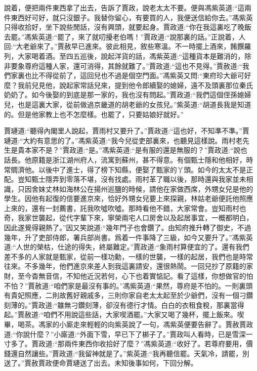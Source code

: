 \begin{parag}
    說着，便把兩件東西拿了出去，告訴了賈政，說老太太不要。便與馮紫英道:“這兩件東西好可好，就只沒銀子。我替你留心，有要買的人，我便送信給你去。”馮紫英只得收拾好，坐下說些閒話，沒有興頭，就要起身。賈政道:“你在我這裏吃了晚飯去罷。”馮紫英道:“罷了，來了就叨擾老伯嗎！”賈政道:“說那裏的話。”正說着，人回:“大老爺來了。”賈赦早已進來。彼此相見，敘些寒溫。不一時擺上酒來，餚饌羅列，大家喝着酒。至四五巡後，說起洋貨的話，馮紫英道:“這種貨本是難消的，除非要象尊府這種人家，還可消得，其餘就難了。”賈政道:“這也不見得。”賈赦道:“我們家裏也比不得從前了，這回兒也不過是個空門面。”馮紫英又問:“東府珍大爺可好麼？我前兒見他，說起家常話兒來，提到他令郎續娶的媳婦，遠不及頭裏那位秦氏奶奶了。如今後娶的到底是那一家的，我也沒有問起。”賈政道:“我們這個侄孫媳婦兒，也是這裏大家，從前做過京畿道的胡老爺的女孩兒。”紫英道:“胡道長我是知道的。但是他家教上也不怎麼樣。也罷了，只要姑娘好就好。”
\end{parag}


\begin{parag}
    賈璉道:“聽得內閣里人說起，賈雨村又要升了。”賈政道:“這也好，不知準不準。”賈璉道:“大約有意思的了。”馮紫英道:“我今兒從吏部裏來，也聽見這樣說。雨村老先生是貴本家不是？”賈政道:“是。”馮紫英道:“是有服的還是無服的？”賈政道:“說也話長。他原籍是浙江湖州府人，流寓到蘇州，甚不得意。有個甄士隱和他相好，時常賙濟他。以後中了進士，得了榜下知縣，便娶了甄家的丫頭。如今的太太不是正配。豈知甄士隱弄到零落不堪，沒有找處。雨村革了職以後，那時還與我家並未相識，只因舍妹丈林如海林公在揚州巡鹽的時候，請他在家做西席，外甥女兒是他的學生。因他有起復的信要進京來，恰好外甥女兒要上來探親，林姑老爺便託他照應上來的，還有一封薦書，託我吹噓吹噓。那時看他不錯，大家常會。豈知雨村也奇，我家世襲起，從代字輩下來，寧榮兩宅人口房舍以及起居事宜，一概都明白，因此遂覺得親熱了。”因又笑說道:“幾年門子也會鑽了。由知府推升轉了御史，不過幾年，升了吏部侍郎，署兵部尚書。爲着一件事降了三級，如今又要升了。”馮紫英道:“人世的榮枯，仕途的得失，終屬難定。”賈政道:“象雨村算便宜的了。還有我們差不多的人家就是甄家，從前一樣功勳，一樣的世襲，一樣的起居，我們也是時常往來。不多幾年，他們進京來差人到我這裏請安，還很熱鬧。一回兒抄了原籍的家財，至今杳無音信，不知他近況若何，心下也着實惦記。看了這樣，你想做官的怕不怕？”賈赦道:“咱們家是最沒有事的。”馮紫英道:“果然，尊府是不怕的。一則裏頭有貴妃照應，二則故舊好親戚多，三則你家自老太太起至於少爺們，沒有一個刁鑽刻薄的。”賈政道:“雖無刁鑽刻薄，卻沒有德行才情。白白的衣租食稅，那裏當得起。”賈赦道:“咱們不用說這些話，大家喫酒罷。”大家又喝了幾杯，擺上飯來。喫畢，喝茶。馮家的小廝走來輕輕的向紫英說了一句，馮紫英便要告辭了。賈赦賈政道:“你說什麼？”小廝道:“外面下雪，早已下了梆子了。”賈政叫人看時，已是雪深一寸多了。賈政道:“那兩件東西你收拾好了麼？”馮紫英道:“收好了。若尊府要用，價錢還自然讓些。”賈政道:“我留神就是了。”紫英道:“我再聽信罷。天氣冷，請罷，別送了。”賈赦賈政便命賈璉送了出去。未知後事如何，下回分解。
\end{parag}